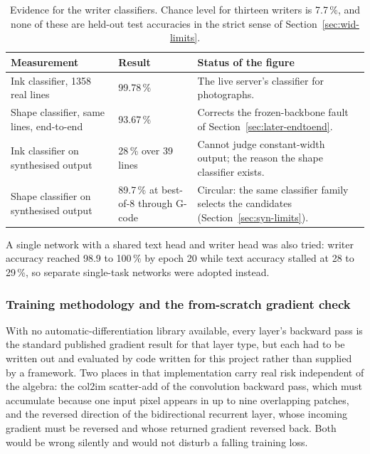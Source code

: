 \begin{table}[!htbp]
\centering
\fontsize{8}{9.6}\selectfont
\setlength{\tabcolsep}{3.5pt}
\begin{tabularx}{\linewidth}{|p{3.1cm}|p{1.9cm}|X|}
\hline
\textbf{Measurement} & \textbf{Result} & \textbf{Status of the figure} \\
\hline
Ink classifier, 1358 real lines & 99.78\,\% & The live server's classifier for photographs. \\
\hline
Shape classifier, same lines, end-to-end & 93.67\,\% & Corrects the frozen-backbone fault of Section~\ref{sec:later-endtoend}. \\
\hline
Ink classifier on synthesised output & 28\,\% over 39 lines & Cannot judge constant-width output; the reason the shape classifier exists. \\
\hline
Shape classifier on synthesised output & 89.7\,\% at best-of-8 through G-code & Circular: the same classifier family selects the candidates (Section~\ref{sec:syn-limits}). \\
\hline
\end{tabularx}
\caption{Evidence for the writer classifiers. Chance level for thirteen writers is 7.7\,\%, and none of these are held-out test accuracies in the strict sense of Section~\ref{sec:wid-limits}.}
\label{tab:wid-results}
\end{table}

A single network with a shared text head and writer head was also tried: writer accuracy reached 98.9 to 100\,\% by epoch 20 while text accuracy stalled at 28 to 29\,\%, so separate single-task networks were adopted instead.

\subsubsection{Training methodology and the from-scratch gradient check}
\label{sec:textrec-numpynn}

With no automatic-differentiation library available, every layer's backward pass is the standard published gradient result for that layer type, but each had to be written out and evaluated by code written for this project rather than supplied by a framework. Two places in that implementation carry real risk independent of the algebra: the col2im scatter-add of the convolution backward pass, which must accumulate because one input pixel appears in up to nine overlapping patches, and the reversed direction of the bidirectional recurrent layer, whose incoming gradient must be reversed and whose returned gradient reversed back. Both would be wrong silently and would not disturb a falling training loss.

